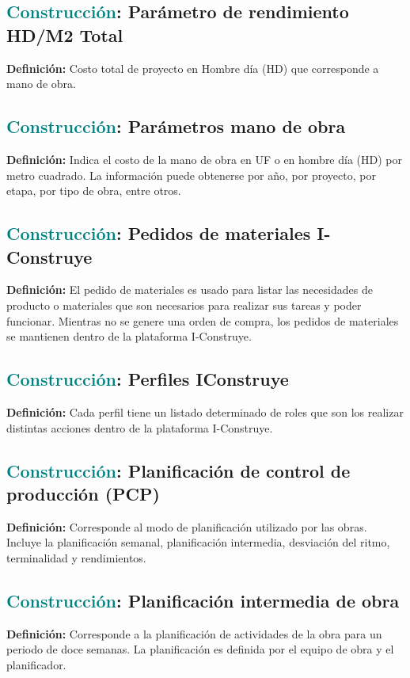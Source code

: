 \documentclass[12pt]{article}
\begin{document}
\subsection{\textcolor{teal}{Construcción}: Parámetro de rendimiento HD/M2 Total}
\textbf{Definición:} Costo total de proyecto en Hombre día (HD) que corresponde a mano de obra.
\subsection{\textcolor{teal}{Construcción}: Parámetros mano de obra}
\textbf{Definición:} Indica el costo de la mano de obra en UF o en hombre día (HD) por metro cuadrado. La información puede obtenerse por año, por proyecto, por etapa, por tipo de obra, entre otros.
\subsection{\textcolor{teal}{Construcción}: Pedidos de materiales I-Construye}
\textbf{Definición:} El pedido de materiales es usado para listar las necesidades de producto o materiales que son necesarios para realizar sus tareas y poder funcionar. Mientras no se genere una orden de compra, los pedidos de materiales se mantienen dentro de la plataforma I-Construye.
\subsection{\textcolor{teal}{Construcción}: Perfiles IConstruye}
\textbf{Definición:} Cada perfil tiene un listado determinado de roles que son los realizar distintas acciones dentro de la plataforma I-Construye.
\subsection{\textcolor{teal}{Construcción}: Planificación de control de producción (PCP)}
\textbf{Definición:} Corresponde al modo de planificación utilizado por las obras. Incluye la planificación semanal, planificación intermedia, desviación del ritmo, terminalidad y rendimientos.
\subsection{\textcolor{teal}{Construcción}: Planificación intermedia de obra}
\textbf{Definición:} Corresponde a la planificación de actividades de la obra para un periodo de doce semanas. La planificación es definida por el equipo de obra y el planificador.
\end{document}
